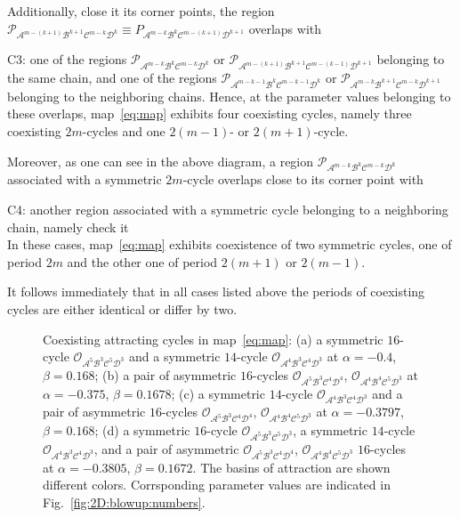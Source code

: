 \documentclass[10pt]{article}
\newif\ifFigs       \Figsfalse
\renewcommand{\P}{{\mathcal P}}
\newcommand{\A}{{\mathcal A}}
\newcommand{\B}{{\mathcal B}}
\newcommand{\C}{{\mathcal C}}
\newcommand{\D}{{\mathcal D}}
\newcommand{\LC}{{\mathcal O}}
\newcommand{\Includegraphics}[2]%
           {\centering
             \ifFigs\texttt{[image: \#2]}%
             \else  \texttt{[image: \#2]}\fi}
\newcommand{\Includesubgraphics}[3]%
{\begin{minipage}[b]{#1}
    \Includegraphics{\textwidth}{#2}\\
    \centerline{{\footnotesize (#3)}}
  \end{minipage}
}
\begin{document}
Additionally, close it its corner points,
the region $\P_{\A^{m-(k+1)}\B^{k+1}\C^{m-k}\D^{k}} \equiv P_{\A^{m-k}   \B^{k}  \C^{m-(k+1)}\D^{k+1}}$
overlaps with
\begin{compactenum}[C1:]
	\item[C3:] one of the regions $\P_{\A^{m-k}\B^{k}\C^{m-k}\D^{k}}$ or
	$\P_{\A^{m-(k+1)}\B^{k+1}\C^{m-(k-1)}\D^{k+1}}$ belonging to the
	same chain, and one of the regions
	$\P_{\A^{m-k-1}\B^{k}\C^{m-k-1}\D^{k}}$ or
	$\P_{\A^{m-k}\B^{k+1}\C^{m-k}\D^{k+1}}$ belonging to the neighboring
	chains.  Hence, at the parameter values belonging to these overlaps,
	map~\eqref{eq:map} exhibits four coexisting cycles, namely three
	coexisting $2m$-cycles and one $2(m-1)$- or $2(m+1)$-cycle.
\end{compactenum}
Moreover, as one can see in the above diagram, a
region  $\P_{\A^{m-k}\B^{k}\C^{m-k}\D^{k}}$ associated with
a symmetric $2m$-cycle overlaps close to its corner point
with
\begin{compactenum}[C1:]
	\item[C4:]
	another region associated with a symmetric cycle belonging to a
	neighboring chain, namely {\color{red} \dotfill check it
			\dotfill}\\ In these cases, map~\eqref{eq:map} exhibits
	coexistence of two symmetric cycles, one of period $2m$ and the other one
	of period $2(m+1)$ or $2(m-1)$.
\end{compactenum}
It follows immediately that in all cases listed above the periods of
coexisting cycles are either identical or differ by two.


\begin{figure}[t]
	\caption{\label{fig:multistability}Coexisting attracting cycles in map~\eqref{eq:map}:
		(a) a symmetric $16$-cycle $\LC_{\A^5\B^3\C^5\D^3}$ and
		a symmetric $14$-cycle $\LC_{\A^4\B^3\C^4\D^3}$
		at $\alpha=-0.4$, $\beta=0.168$;
		(b) a pair of asymmetric $16$-cycles $\LC_{\A^5\B^3\C^4\D^4}$, $\LC_{\A^4\B^4\C^5\D^3}$
		at $\alpha=-0.375$, $\beta=0.1678$;
		(c) a symmetric $14$-cycle $\LC_{\A^4\B^3\C^4\D^3}$ and a pair of
		asymmetric $16$-cycles $\LC_{\A^5\B^3\C^4\D^4}$, $\LC_{\A^4\B^4\C^5\D^3}$
		at $\alpha=-0.3797$, $\beta=0.168$;
		(d) a symmetric $16$-cycle $\LC_{\A^5\B^3\C^5\D^3}$,
		a symmetric $14$-cycle $\LC_{\A^4\B^3\C^4\D^3}$,
		and a pair of asymmetric $\LC_{\A^5\B^3\C^4\D^4}$, $\LC_{\A^4\B^4\C^5\D^3}$
		$16$-cycles at $\alpha=-0.3805$, $\beta=0.1672$.
		The basins of attraction are shown different colors.
		Corrsponding parameter values are indicated in
		Fig.~\ref{fig:2D:blowup:numbers}.}
\end{figure}
\end{document}
